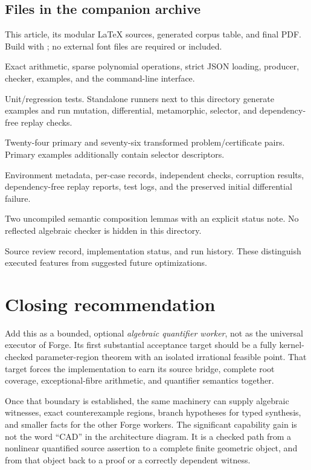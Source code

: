 \subsection{Files in the companion archive}
\begin{description}[style=nextline,leftmargin=0pt,labelwidth=0pt,labelsep=0pt]
\item[\code{article/}]
This article, its modular LaTeX sources, generated corpus table, and final PDF. Build with ; no external font files are required or included.
\item[\code{prototype/atlas/}]
Exact arithmetic, sparse polynomial operations, strict JSON loading, producer, checker, examples, and the command-line interface.
\item[\code{prototype/tests/}]
Unit/regression tests. Standalone runners next to this directory generate examples and run mutation, differential, metamorphic, selector, and dependency-free replay checks.
\item[\code{examples/} and \code{metamorphic-corpus/}]
Twenty-four primary and seventy-six transformed problem/certificate pairs. Primary examples additionally contain selector descriptors.
\item[\code{results/}]
Environment metadata, per-case records, independent checks, corruption results, dependency-free replay reports, test logs, and the preserved initial differential failure.
\item[\code{lean/}]
Two uncompiled semantic composition lemmas with an explicit status note. No reflected algebraic checker is hidden in this directory.
\item[\code{docs/}]
Source review record, implementation status, and run history. These distinguish executed features from suggested future optimizations.
\end{description}

\section{Closing recommendation}
Add this as a bounded, optional \emph{algebraic quantifier worker}, not as the universal executor of Forge. Its first substantial acceptance target should be a fully kernel-checked parameter-region theorem with an isolated irrational feasible point. That target forces the implementation to earn its source bridge, complete root coverage, exceptional-fibre arithmetic, and quantifier semantics together.

Once that boundary is established, the same machinery can supply algebraic witnesses, exact counterexample regions, branch hypotheses for typed synthesis, and smaller facts for the other Forge workers. The significant capability gain is not the word ``CAD'' in the architecture diagram. It is a checked path from a nonlinear quantified source assertion to a complete finite geometric object, and from that object back to a proof or a correctly dependent witness.
